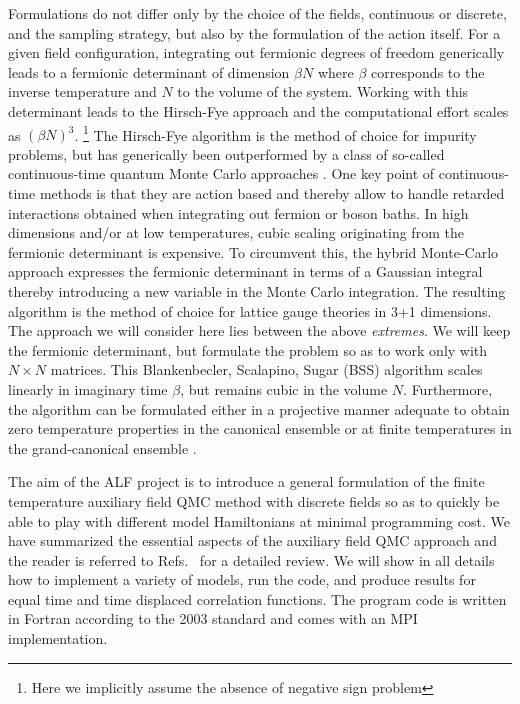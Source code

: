  Formulations do not differ  only  by the choice of the fields, continuous or discrete,  and the sampling strategy, but also by the  formulation of the action itself.
For a given field configuration, integrating out  fermionic degrees of freedom generically leads to a fermionic determinant of dimension $\beta N$ where $\beta $  corresponds to the inverse temperature and $N$ to the volume of the system.  Working  with this determinant leads to the  Hirsch-Fye approach \cite{HirschFye86}  and the computational effort scales as $\left( \beta N \right)^3$. \footnote{Here we implicitly assume the absence of negative sign problem}  The Hirsch-Fye  algorithm is the method of choice for impurity problems, but has  generically been outperformed by a class of so-called continuous-time quantum Monte Carlo approaches  
\cite{Gull_rev,Assaad14_rev, Assaad07}.    One key point of continuous-time methods  is that they are action based  and thereby allow to handle retarded interactions obtained when integrating out fermion or boson baths.  In high dimensions and/or at low temperatures, cubic scaling originating from the   fermionic determinant is expensive.   To circumvent this,  the hybrid Monte-Carlo approach  \cite{Scalettar86,Duane87}  expresses the fermionic determinant in terms of a Gaussian integral thereby introducing a new variable in the Monte Carlo integration.    The resulting algorithm is the method of choice for lattice gauge theories in 3+1 dimensions. 
The approach we will consider here lies between the  above \textit{extremes}.  We will keep the fermionic determinant, but formulate  the problem so as to  work only with $N\times N$ matrices.    This 
Blankenbecler,  Scalapino, Sugar (BSS)  algorithm scales linearly in  imaginary time $\beta$, but remains cubic in the volume $N$.    Furthermore, the algorithm can be formulated either in a projective manner \cite{Sugiyama86,Sorella89} adequate to obtain zero temperature properties in the  canonical ensemble or at finite temperatures in the  grand-canonical ensemble \cite{White89}.

The aim of the ALF project is to introduce a general formulation of the finite temperature  auxiliary field QMC method with discrete  fields so as to quickly be able to play with different model Hamiltonians  at  minimal programming cost.   We have summarized  the essential aspects of the   auxiliary field QMC  approach and the  reader is referred  to  Refs.~\cite{Assaad02,Assaad08_rev} for a detailed review.    
We will show in  all details how to implement a variety of models, run the code, and produce  results for  equal time and time displaced correlation functions. 
The program code is written in Fortran according to the 2003 standard and  comes with an MPI implementation.  


